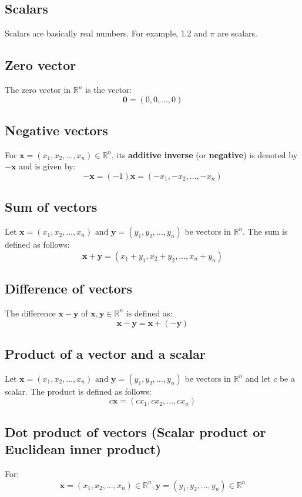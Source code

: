 \documentclass[11pt]{article}
\begin{document}
\subsection{Scalars}
\label{sec:org7216f77}
Scalars are basically real numbers. For example, 1.2 and \(\pi\) are scalars.
\subsection{Zero vector}
\label{sec:org322575d}
The zero vector in \(\mathbb{R}^n\) is the vector:
\[\boldsymbol{0} = (0, 0, \ldots, 0)\]
\subsection{Negative vectors}
\label{sec:org1ccf3b4}
For \(\boldsymbol{x} = (x_1, x_2, \ldots, x_n) \in \mathbb{R}^n\), its \textbf{additive inverse} (or \textbf{negative}) is denoted by \(- \boldsymbol{x}\) and is given by:
\[- \boldsymbol{x} = (-1) \boldsymbol{x} = (-x_1, -x_2, \ldots, -x_n)\]
\subsection{Sum of vectors}
\label{sec:orgd7676fd}
Let \(\boldsymbol{x} = (x_1, x_2, \ldots, x_n) \text{ and } \boldsymbol{y} = (y_1, y_2, \ldots, y_n)\) be vectors in \(\mathbb{R}^n\). The sum is defined as follows:
\[\boldsymbol{x} + \boldsymbol{y} = (x_1 + y_1, x_2 + y_2, \ldots, x_n + y_n)\]
\subsection{Difference of vectors}
\label{sec:org220ae69}
The difference \(\boldsymbol{x} - \boldsymbol{y}\) of \(\boldsymbol{x}, \boldsymbol{y} \in \mathbb{R}^n\) is defined as:
\[\boldsymbol{x} - \boldsymbol{y} = \boldsymbol{x} + (- \boldsymbol{y})\]
\subsection{Product of a vector and a scalar}
\label{sec:org28eed28}
Let \(\boldsymbol{x} = (x_1, x_2, \ldots, x_n) \text{ and } \boldsymbol{y} = (y_1, y_2, \ldots, y_n)\) be vectors in \(\mathbb{R}^n\) and let \(c\) be a scalar. The product is defined as follows:
\[c \boldsymbol{x} = (cx_1, cx_2, \ldots, cx_n)\]

\newpage
\subsection{Dot product of vectors (Scalar product or Euclidean inner product)}
\label{sec:orga1e603d}
For:
\[\boldsymbol{x} = (x_1, x_2, \ldots, x_n) \in \mathbb{R}^n, \boldsymbol{y} = (y_1, y_2, \ldots, y_n) \in \mathbb{R}^n\]
\end{document}
